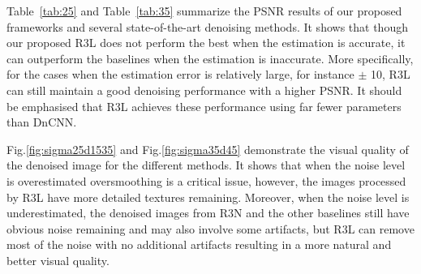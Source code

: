 \documentclass{article}
\begin{document}
\begin{table}[htbp]
\caption{The average PSNR (dB) results of different methods. All the methods are set/trained with $\sigma=25$. The best and the second best results are highlighted in \textcolor{red}{red} and \textcolor{blue}{blue} respectively. } \label{tab:25} 
\centering
{}
\end{table}
Table~\ref{tab:25} and Table~\ref{tab:35} summarize the PSNR results of our proposed frameworks and several
state-of-the-art denoising methods. It shows that though our proposed R3L does not perform the best when the estimation is accurate, it can outperform the baselines when the estimation is inaccurate. More specifically, for the cases when the estimation error is relatively large, for instance $\pm$ 10, R3L can still maintain a good denoising performance with a higher PSNR. It should be emphasised that R3L achieves these performance using far fewer parameters than DnCNN.\par Fig.\ref{fig:sigma25d1535} and Fig.\ref{fig:sigma35d45} demonstrate the visual quality of the denoised image for the different methods.
It shows that when the noise level is overestimated oversmoothing is a critical issue, however, the images processed by R3L have more detailed textures remaining. Moreover, when the noise level is underestimated, the denoised images from R3N and the other baselines still have obvious noise remaining and may also involve some artifacts, but R3L can remove most of the noise with no additional artifacts resulting in a more natural and better visual quality. 
\end{document}
